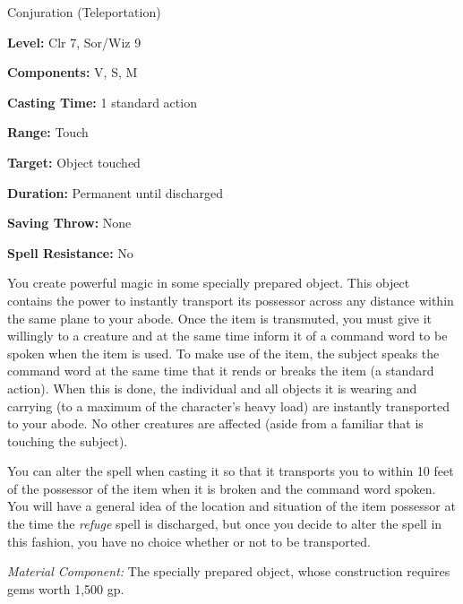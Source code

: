 
Conjuration (Teleportation)

\textbf{Level:} Clr 7, Sor/Wiz 9

\textbf{Components:} V, S, M

\textbf{Casting Time:} 1 standard action

\textbf{Range:} Touch

\textbf{Target:} Object touched

\textbf{Duration:} Permanent until discharged

\textbf{Saving Throw:} None

\textbf{Spell Resistance:} No

You create powerful magic in some specially prepared object. This object contains 
the power to instantly transport its possessor across any distance within the same 
plane to your abode. Once the item is transmuted, you must give it willingly to 
a creature and at the same time inform it of a command word to be spoken when the 
item is used. To make use of the item, the subject speaks the command word at the 
same time that it rends or breaks the item (a standard action). When this is done, 
the individual and all objects it is wearing and carrying (to a maximum of the 
character's heavy load) are instantly transported to your abode. No other creatures 
are affected (aside from a familiar that is touching the subject).

You can alter the spell when casting it so that it transports you to within 10 
feet of the possessor of the item when it is broken and the command word spoken. 
You will have a general idea of the location and situation of the item possessor 
at the time the \textit{refuge} spell is discharged, but once you decide to alter 
the spell in this fashion, you have no choice whether or not to be transported.

\textit{Material Component:} The specially prepared object, whose construction 
requires gems worth 1,500 gp.

